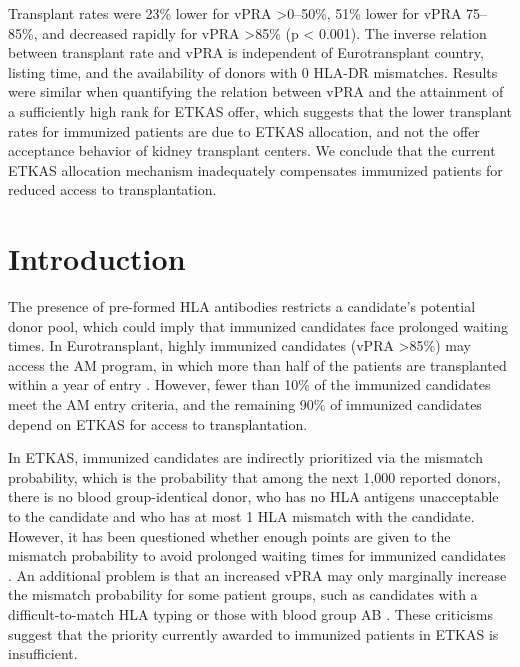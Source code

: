 \documentclass[11pt,twoside,]{book}
\begin{document}
Transplant rates were 23\% lower for vPRA \textgreater0--50\%, 51\%
lower for vPRA 75--85\%, and decreased rapidly for vPRA \textgreater85\%
(p \textless{} 0.001). The inverse relation between transplant rate and vPRA is
independent of Eurotransplant country, listing time, and the availability
of donors with 0 HLA-DR mismatches. Results were similar when quantifying the
relation between vPRA and the attainment of a sufficiently high rank for
ETKAS offer, which suggests that the lower transplant rates for immunized
patients are due to ETKAS allocation, and not the offer acceptance behavior
of kidney transplant centers. We conclude that the current ETKAS allocation mechanism
inadequately compensates immunized patients for reduced access to
transplantation.

\newpage
\normalsize

\section{Introduction}\label{introduction-3}

The presence of pre-formed HLA antibodies restricts a candidate's
potential donor pool, which could imply that immunized candidates face
prolonged waiting times. In Eurotransplant, highly immunized candidates
(vPRA \textgreater85\%) may access the AM program, in which more than half
of the patients are transplanted within a year of entry \citep{Heidt2021}.
However, fewer than 10\% of the immunized candidates meet the AM entry criteria,
and the remaining 90\% of immunized candidates depend on ETKAS for access to transplantation.

In ETKAS, immunized candidates are indirectly prioritized via the mismatch
probability, which is the probability that among the next 1,000
reported donors, there is no blood group-identical donor, who has no HLA antigens
unacceptable to the candidate and who has at most 1 HLA mismatch with the candidate.
However, it has been questioned
whether enough points are given to the mismatch probability to avoid prolonged
waiting times for immunized candidates \citep{susal2015}. An additional problem
is that an increased vPRA may only marginally increase the mismatch probability
for some patient groups, such as candidates with a difficult-to-match HLA typing
or those with blood group AB \citep{ziemannUnacceptableHumanLeucocyte2017}. These criticisms suggest that the
priority currently awarded to immunized patients in ETKAS is insufficient.
\end{document}
